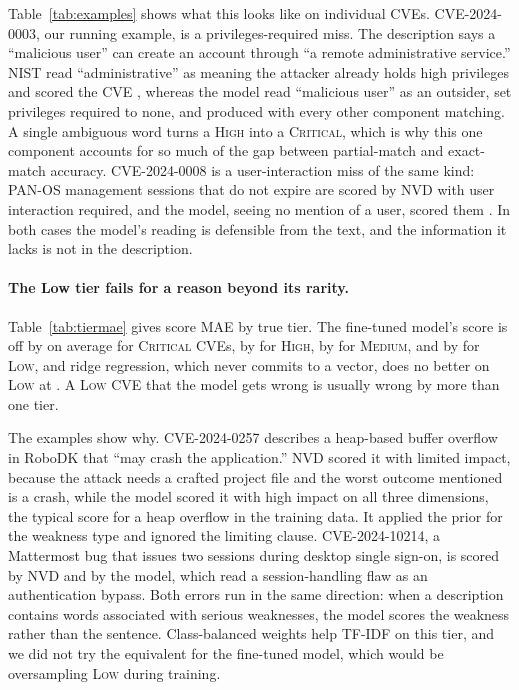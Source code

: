 

Table~\ref{tab:examples} shows what this looks like on individual CVEs.
CVE-2024-0003, our running example, is a privileges-required miss.
The description says a ``malicious user'' can create an account through ``a remote administrative service.''
NIST read ``administrative'' as meaning the attacker already holds high privileges and scored the CVE \nExPurityTrue{}, whereas the model read ``malicious user'' as an outsider, set privileges required to none, and produced \nExPurityPred{} with every other component matching.
A single ambiguous word turns a \textsc{High} into a \textsc{Critical}, which is why this one component accounts for so much of the gap between partial-match and exact-match accuracy.
CVE-2024-0008 is a user-interaction miss of the same kind: PAN-OS management sessions that do not expire are scored \nExPanOSTrue{} by NVD with user interaction required, and the model, seeing no mention of a user, scored them \nExPanOSPred{}.
In both cases the model's reading is defensible from the text, and the information it lacks is not in the description.

\paragraph{The Low tier fails for a reason beyond its rarity.}
Table~\ref{tab:tiermae} gives score MAE by true tier.
The fine-tuned model's score is off by \nLoRAfMaeCritical{} on average for \textsc{Critical} CVEs, by \nLoRAfMaeHigh{} for \textsc{High}, by \nLoRAfMaeMedium{} for \textsc{Medium}, and by \nLoRAfMaeLow{} for \textsc{Low}, and ridge regression, which never commits to a vector, does no better on \textsc{Low} at \nLRdMaeLow{}.
A \textsc{Low} CVE that the model gets wrong is usually wrong by more than one tier.



The examples show why.
CVE-2024-0257 describes a heap-based buffer overflow in RoboDK that ``may crash the application.''
NVD scored it \nExRoboDKTrue{} with limited impact, because the attack needs a crafted project file and the worst outcome mentioned is a crash, while the model scored it \nExRoboDKPred{} with high impact on all three dimensions, the typical score for a heap overflow in the training data.
It applied the prior for the weakness type and ignored the limiting clause.
CVE-2024-10214, a Mattermost bug that issues two sessions during desktop single sign-on, is scored \nExMattermostTrue{} by NVD and \nExMattermostPred{} by the model, which read a session-handling flaw as an authentication bypass.
Both errors run in the same direction: when a description contains words associated with serious weaknesses, the model scores the weakness rather than the sentence.
Class-balanced weights help TF-IDF on this tier, and we did not try the equivalent for the fine-tuned model, which would be oversampling \textsc{Low} during training.


